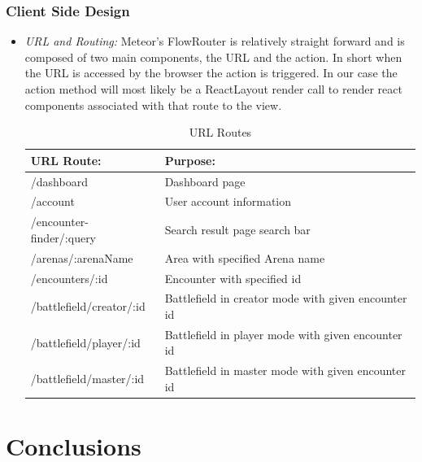\documentclass[letterpaper, 10 pt, conference]{ieeeconf}
\begin{document}
\subsubsection{Client Side Design}
\begin{itemize}
	\item \textit{URL and Routing:} Meteor's FlowRouter is relatively straight forward and is composed of two main components,
	the URL and the action. In short when the URL is accessed by the
	browser the action is triggered. In our case the action method will most likely be
	a ReactLayout render call to render react components associated with that route
	to the view.
		\begin{table}[H]
		\begin{center}
			\begin{tabular}{ |p{2.5cm}|p{4cm}| } 
				\hline
				URL Route: & Purpose: \\
				\hline
				/dashboard & Dashboard page \\
				/account & User account information\\
				/encounter-finder/:query & Search result page search bar  \\
				/arenas/:arenaName & Area with specified Arena name  \\
				/encounters/:id & Encounter with specified id \\
				/battlefield/creator/:id & Battlefield in creator mode with given encounter id \\
				/battlefield/player/:id & Battlefield in player mode with given encounter id \\
				/battlefield/master/:id & Battlefield in master mode with given encounter id \\	
				\hline
			\end{tabular}
		\end{center}
		\caption{URL Routes} \label{fig: URL Routes}
	\end{table}
\end{itemize}
\section{Conclusions}
\end{document}
